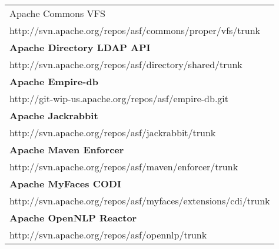 \begin{table}[htb]
\begin{tabular}{|p{130mm}|}
Apache Commons VFS                                 \\ http://svn.apache.org/repos/asf/commons/proper/vfs/trunk                     \\ \hline \bf
Apache Directory LDAP API                          \\ http://svn.apache.org/repos/asf/directory/shared/trunk                       \\ \hline \bf
Apache Empire-db                                   \\ http://git-wip-us.apache.org/repos/asf/empire-db.git                         \\ \hline \bf
Apache Jackrabbit                                  \\ http://svn.apache.org/repos/asf/jackrabbit/trunk                             \\ \hline \bf
Apache Maven Enforcer                              \\ http://svn.apache.org/repos/asf/maven/enforcer/trunk                         \\ \hline \bf
Apache MyFaces CODI                                \\ http://svn.apache.org/repos/asf/myfaces/extensions/cdi/trunk                 \\ \hline \bf
Apache OpenNLP Reactor                             \\ http://svn.apache.org/repos/asf/opennlp/trunk                                \\ \hline 

\end{tabular}
\end{table}
\nopagebreak[4]

